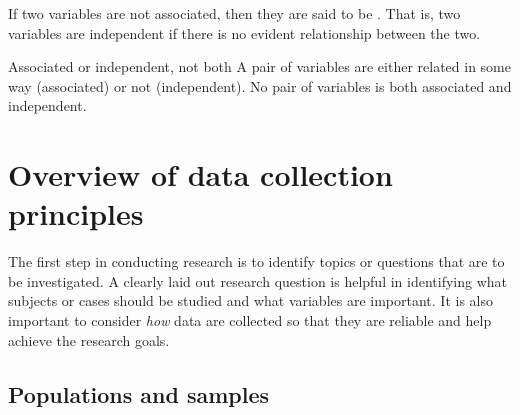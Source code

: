
If two variables are not associated,
then they are said to be .
That is, two variables are independent if there
is no evident relationship between the two.

\begin{onebox}{Associated or independent, not both}
A pair of variables are either related in some way (associated) or not (independent). No pair of variables is both associated and independent.
\end{onebox}



\section{Overview of data collection principles}
\label{overviewOfDataCollectionPrinciples}


The first step in conducting research is to identify topics or questions that are to be investigated. A clearly laid out research question is helpful in identifying what subjects or cases should be studied and what variables are important. It is also important to consider \emph{how} data are collected so that they are reliable and help achieve the research goals.

\subsection{Populations and samples}
\label{populationsAndSamples}

